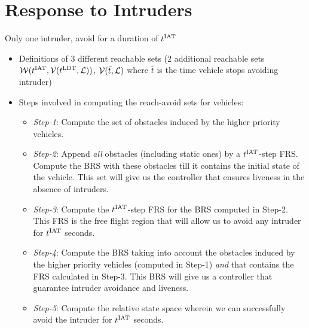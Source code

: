 \section{Response to Intruders \label{sec:HJIVI}}
\begin{assumption}
\label{as:avoidOnce}
Only one intruder, avoid for a duration of $t^\text{IAT}$
\end{assumption}


\begin{itemize}
\item Definitions of 3 different reachable sets (2 additional reachable sets $\mathcal{W}(t^\text{IAT}, \mathcal{V}(t^\text{LDT}, \mathcal{L}))$, $\mathcal{V}(\bar t, \mathcal{L})$ where $\bar t$ is the time vehicle stops avoiding intruder)

\item Steps involved in computing the reach-avoid sets for vehicles:
\begin{itemize}
\item \textit{Step-1}: Compute the set of obstacles induced by the higher priority vehicles. 
\item \textit{Step-2}: Append \textit{all} obstacles (including static ones) by a $t^\text{IAT}$-step FRS. Compute the BRS with these obstacles till it contains the initial state of the vehicle. This set will give us the controller that ensures liveness in the absence of intruders. 
\item \textit{Step-3}: Compute the $t^\text{IAT}$-step FRS for the BRS computed in Step-2. This FRS is the free flight region that will allow us to avoid any intruder for $t^\text{IAT}$ seconds. 
\item \textit{Step-4}: Compute the BRS taking into account the obstacles induced by the higher priority vehicles (computed in Step-1) \textit{and} that contains the FRS calculated in Step-3. This BRS will give us a controller that guarantee intruder avoidance and liveness. 
\item \textit{Step-5}: Compute the relative state space wherein we can successfully avoid the intruder for $t^\text{IAT}$ seconds. 
\end{itemize}
\end{itemize}

